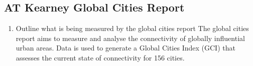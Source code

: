 	\subsection{AT Kearney Global Cities Report}
		\begin{enumerate}
			\item Outline what is being measured by the global cities report
				\subitem The global cities report aims to measure and analyse the connectivity of globally influential urban areas. Data is used to generate a Global Cities Index (GCI) that assesses the current state of connectivity for 156 cities.
		\end{enumerate}
